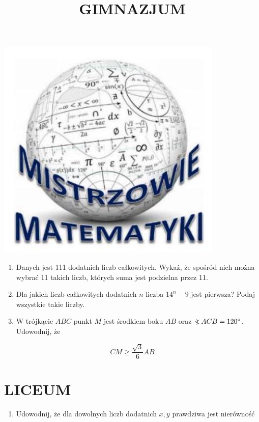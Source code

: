 \documentclass[10pt]{article}
\title{GIMNAZJUM }
\author{}
\date{}
\newcommand\Varangle{\mathop{{<\!\!\!\!\!\text{\small)}}\:}\nolimits}
\begin{document}
\maketitle
\begin{center}
\includegraphics[max width=\textwidth]{2024_11_21_f324bfd25ba3c29c98f7g-1}
\end{center}

\begin{enumerate}
  \item Danych jest 111 dodatnich liczb całkowitych. Wykaż, że spośród nich można wybrać 11 takich liczb, których suma jest podzielna przez 11.
  \item Dla jakich liczb całkowitych dodatnich \(n\) liczba \(14^{n}-9\) jest pierwsza? Podaj wszystkie takie liczby.
  \item W trójkącie \(A B C\) punkt \(M\) jest środkiem boku \(A B\) oraz \(\Varangle A C B=120^{\circ}\). Udowodnij, że
\end{enumerate}

\[
C M \geq \frac{\sqrt{3}}{6} A B
\]

\section*{LICEUM}
\begin{enumerate}
  \item Udowodnij, że dla dowolnych liczb dodatnich \(x, y\) prawdziwa jest nierówność
\end{enumerate}
\end{document}
